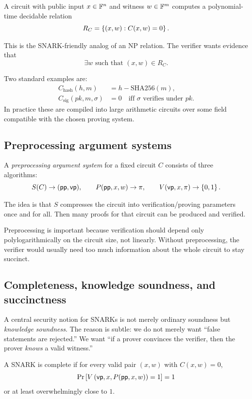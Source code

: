 A circuit with public input $x\in \mathbb{F}^n$ and witness $w\in \mathbb{F}^m$ computes a polynomial-time decidable relation
\[
R_C = \left\{(x,w) : C(x,w)=0\right\}.
\]

This is the SNARK-friendly analog of an NP relation. The verifier wants evidence that
\[
\exists w \text{ such that } (x,w)\in R_C.
\]

\begin{example}
Two standard examples are:
\begin{align*}
C_{\mathrm{hash}}(h,m) &= h - \mathrm{SHA256}(m),\\
C_{\mathrm{sig}}(pk,m,\sigma) &= 0 \quad \text{iff } \sigma \text{ verifies under } pk.
\end{align*}
In practice these are compiled into large arithmetic circuits over some field compatible with the chosen proving system.
\end{example}

\subsection{Preprocessing argument systems}

A \emph{preprocessing argument system} for a fixed circuit $C$ consists of three algorithms:
\[
S(C) \to (\mathsf{pp},\mathsf{vp}),\qquad P(\mathsf{pp},x,w) \to \pi,\qquad V(\mathsf{vp},x,\pi)\to\left\{0,1\right\}.
\]

The idea is that $S$ compresses the circuit into verification/proving parameters once and for all. Then many proofs for that circuit can be produced and verified.

Preprocessing is important because verification should depend only polylogarithmically on the circuit size, not linearly. Without preprocessing, the verifier would usually need too much information about the whole circuit to stay succinct.

\subsection{Completeness, knowledge soundness, and succinctness}

A central security notion for SNARKs is not merely ordinary soundness but \emph{knowledge soundness}. The reason is subtle: we do not merely want ``false statements are rejected.'' We want ``if a prover convinces the verifier, then the prover \emph{knows} a valid witness.''

\begin{definition}[Completeness]
A SNARK is complete if for every valid pair $(x,w)$ with $C(x,w)=0$,
\[
\Pr\left[V\left(\mathsf{vp},x,P(\mathsf{pp},x,w)\right)=1\right]=1
\]
or at least overwhelmingly close to $1$.
\end{definition}

